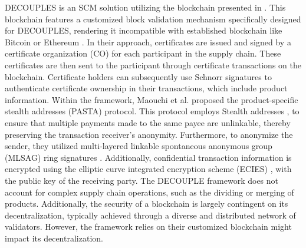 DECOUPLES \cite{Maouchi2019DECOUPLES} is an SCM solution utilizing the blockchain presented in \cite{Flymen2020Learn}. This blockchain features a customized block validation mechanism specifically designed for DECOUPLES, rendering it incompatible with established blockchain like Bitcoin \cite{nakamoto2008bitcoin} or Ethereum \cite{ethereum}. In their approach, certificates are issued and signed by a certificate organization (CO) for each participant in the supply chain. These certificates are then sent to the participant through certificate transactions on the blockchain. Certificate holders can subsequently use Schnorr signatures \cite{Schnorr1991Signature} to authenticate certificate ownership in their transactions, which include product information.
Within the framework, Maouchi et al. proposed the product-specific stealth addresses (PASTA) protocol. This protocol employs Stealth addresses \cite{Nicolas2017Stealth}, to ensure that multiple payments made to the same payee are unlinkable, thereby preserving the transaction receiver's anonymity. Furthermore, to anonymize the sender, they utilized multi-layered linkable spontaneous anonymous group (MLSAG) ring signatures \cite{noether2016ring}. Additionally, confidential transaction information is encrypted using the elliptic curve integrated encryption scheme (ECIES) \cite{brown2009standards}, with the public key of the receiving party. 
The DECOUPLE framework does not account for complex supply chain operations, such as the dividing or merging of products. Additionally, the security of a blockchain  is largely contingent on its decentralization, typically achieved through a diverse and distributed network of validators. However, the framework relies on their customized blockchain might impact its decentralization.





